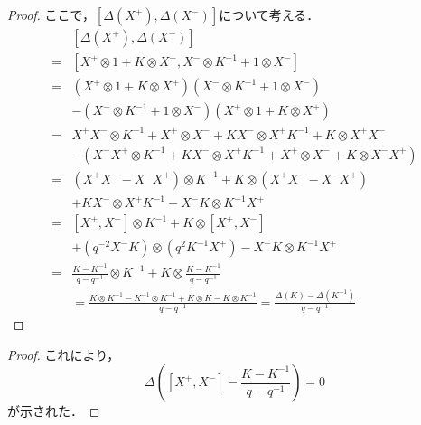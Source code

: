 \documentclass[10pt,dvipdfm]{beamer}
\begin{document}
  \begin{frame}
    \begin{proof}
      ここで，$[\Delta(X^+),\Delta(X^-)]$について考える．
      \begin{align*}
        &[\Delta(X^+),\Delta(X^-)] \\
        =& [X^+\otimes 1 + K\otimes X^+,X^-\otimes K^{-1} + 1\otimes X^-]\\
        =&(X^+\otimes 1 + K\otimes X^+)(X^-\otimes K^{-1} + 1\otimes X^-)\\
        &-(X^-\otimes K^{-1} + 1\otimes X^-)(X^+\otimes 1 + K\otimes X^+)\\
        =&X^+X^-\otimes K^{-1} + X^+\otimes X^- + KX^-\otimes X^+K^{-1} + K\otimes X^+X^-\\
        &-(X^-X^+\otimes K^{-1} + KX^- \otimes X^+K^{-1} + X^+\otimes X^- + K\otimes X^-X^+)\\
        =&(X^+X^- - X^-X^+)\otimes K^{-1} + K \otimes (X^+X^- - X^-X^+)\\
        &+ KX^-\otimes X^+K^{-1} - X^-K\otimes K^{-1}X^+\\
        =&[X^+,X^-]\otimes K^{-1} + K\otimes [X^+,X^-]\\
        &+ (q^{-2}X^-K)\otimes(q^2K^{-1}X^+) - X^-K\otimes K^{-1}X^+\\
        =&\frac{K-K^{-1}}{q-q^{-1}}\otimes K^{-1} + K\otimes \frac{K-K^{-1}}{q-q^{-1}}\\
        &= \frac{K\otimes K^{-1} - K^{-1}\otimes K^{-1}+K\otimes K -K\otimes K^{-1}}{q-q^{-1}}=\frac{\Delta(K) - \Delta(K^{-1})}{q-q^{-1}}
      \end{align*}
      \let\qedsymbol\relax
    \end{proof}
  \end{frame}
  \begin{frame}
    \begin{proof}
      これにより，
      \[
      \Delta\left([X^+,X^-] - \frac{K-K^{-1}}{q-q^{-1}}\right)=0
      \]
      が示された．
    \end{proof}
  \end{frame}
\end{document}
